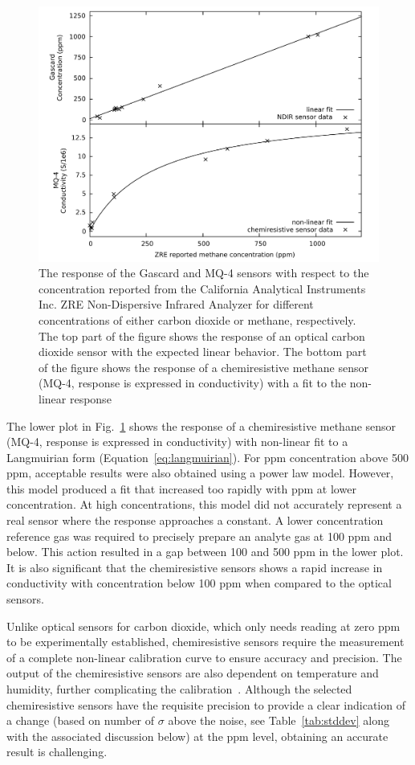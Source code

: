 \documentclass[preprint,sort&compress]{elsarticle}
\begin{document}
			\begin{figure}[!t]
				\centering
				\includegraphics[width=0.9\columnwidth]{honey9.pdf}
				\caption{The response of the Gascard and MQ-4 sensors with respect to the concentration reported from the California Analytical Instruments Inc. ZRE Non-Dispersive Infrared Analyzer for different concentrations of either carbon dioxide or methane, respectively. The top part of the figure shows the response of an optical carbon dioxide sensor with the expected linear behavior.  The bottom part of the figure shows the response of a chemiresistive methane sensor (MQ-4, response is expressed in conductivity) with a fit to the non-linear response}
				\label{fig:gascardcodiff}
			\end{figure}
			
			The lower plot in Fig.~\ref{fig:gascardcodiff} shows the response of a chemiresistive methane sensor (MQ-4, response is expressed in conductivity) with non-linear fit to a  Langmuirian form  (Equation~\ref{eq:langmuirian}). For ppm concentration above 500 ppm, acceptable results were also obtained using a power law model. However, this model produced a fit that increased too rapidly with ppm at lower concentration.  At high concentrations, this model did not accurately represent a real sensor where the response approaches a constant.  A lower concentration reference gas was required to precisely prepare an analyte gas at 100 ppm and below.  This action resulted in a gap between 100 and 500 ppm in the lower plot.   It is also significant that the chemiresistive sensors shows a rapid increase in conductivity with concentration below 100 ppm when compared to the optical sensors.

			Unlike optical sensors for carbon dioxide, which only needs reading at zero ppm to be experimentally established, chemiresistive sensors require the measurement of a complete non-linear calibration curve to ensure accuracy and precision.  The output of the chemiresistive sensors are also dependent on temperature and humidity, further complicating the calibration~\cite{benkstein_analytical_2014}.  Although the selected chemiresistive sensors have the requisite precision to provide a clear indication of a change (based on number of $\sigma$ above the noise, see Table~\ref{tab:stddev} along with the associated discussion below) at the ppm level, obtaining an accurate result is challenging.
\end{document}
